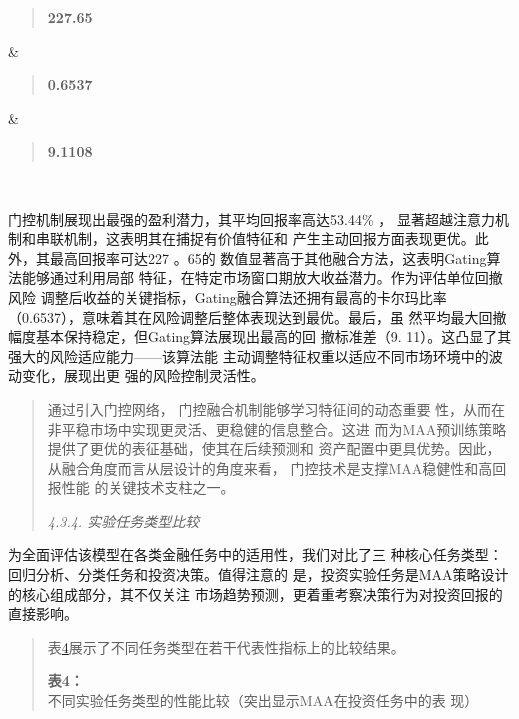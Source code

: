 \documentclass[UTF8]{ctexart}
\begin{document}
{\begin{longtable}[]
\begin{minipage}[t]{\linewidth}
\begin{quote}
\textbf{227.65}
\end{quote}
\end{minipage} & \begin{minipage}[t]{\linewidth}\raggedright
\begin{quote}
\textbf{0.6537}
\end{quote}
\end{minipage} & \begin{minipage}[t]{\linewidth}\raggedright
\begin{quote}
\textbf{9.1108}
\end{quote}
\end{minipage} \\
\end{longtable}
}

门控机制展现出最强的盈利潜力，其平均回报率高达53.44\% ，
显著超越注意力机制和串联机制，这表明其在捕捉有价值特征和
产生主动回报方面表现更优。此外，其最高回报率可达227 。65的
数值显著高于其他融合方法，这表明Gating算法能够通过利用局部
特征，在特定市场窗口期放大收益潜力。作为评估单位回撤风险
调整后收益的关键指标，Gating融合算法还拥有最高的卡尔玛比率
（0.6537），意味着其在风险调整后整体表现达到最优。最后，虽
然平均最大回撤幅度基本保持稳定，但Gating算法展现出最高的回 撤标准差（9.
11）。这凸显了其强大的风险适应能力------该算法能
主动调整特征权重以适应不同市场环境中的波动变化，展现出更
强的风险控制灵活性。

\begin{quote}
通过引入门控网络， 门控融合机制能够学习特征间的动态重要
性，从而在非平稳市场中实现更灵活、更稳健的信息整合。这进
而为MAA预训练策略提供了更优的表征基础，使其在后续预测和
资产配置中更具优势。因此，从融合角度而言从层设计的角度来看，
门控技术是支撑MAA稳健性和高回报性能 的关键技术支柱之一。

\emph{4.3.4. 实验任务类型比较}
\end{quote}

为全面评估该模型在各类金融任务中的适用性，我们对比了三 种核心任务类型：
回归分析、分类任务和投资决策。值得注意的
是，投资实验任务是MAA策略设计的核心组成部分，其不仅关注
市场趋势预测，更着重考察决策行为对投资回报的直接影响。

\begin{quote}
\protect{}\label{bookmark49}{}表\hyperref[bookmark49]{4}展示了不同任务类型在若干代表性指标上的比较结果。

\textbf{表4：}不同实验任务类型的性能比较（突出显示MAA在投资任务中的表
现）
\end{quote}
\end{document}
